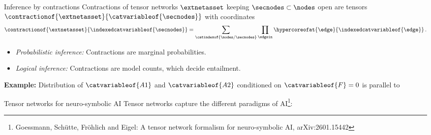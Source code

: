 \documentclass{beamer}
\begin{document}
    \begin{frame}{Inference by contractions}
        Contractions of tensor networks $\extnetasset$ keeping $\secnodes\subset\nodes$ open are tensors $\contractionof{\extnetasset}{\catvariableof{\secnodes}}$ with coordinates
        \begin{align*}
            \contractionof{\extnetasset}{\indexedcatvariableof{\secnodes}}
            =\sum_{\catindexof{\nodes/\secnodes}} \prod_{\edgein} \hypercoreofat{\edge}{\indexedcatvariableof{\edge}} \, .
        \end{align*}


        \begin{itemize}
            \item \emph{Probabilistic inference:} Contractions are marginal probabilities.
            \item \emph{Logical inference:} Contractions are model counts, which decide entailment.
        \end{itemize}

            {\bf Example:} Distribution of $\catvariableof{A1}$ and $\catvariableof{A2}$ conditioned on $\catvariableof{F}=0$ is parallel to
        \begin{center}
            
        \end{center}

    \end{frame}


    \begin{frame}{Tensor networks for neuro-symbolic AI}
        Tensor networks capture the different paradigms of AI\footnote{\tiny Goessmann, Schütte, Fröhlich and Eigel: A tensor network formalism for neuro-symbolic AI, arXiv:2601.15442}:
        \begin{center}
            
        \end{center}
    \end{frame}
\end{document}
